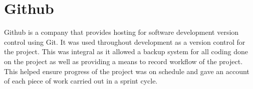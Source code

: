 \section{Github}
Github is a company that provides hosting for software development version control using Git. It was used throughout development as a version control for the project. This was integral as it allowed a backup system for all coding done on the project as well as providing a means to record workflow of the project. This helped ensure progress of the project was on schedule and gave an account of each piece of work carried out in a sprint cycle.